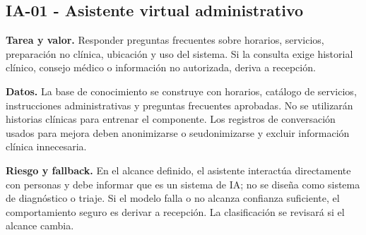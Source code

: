 \documentclass[11pt,a4paper]{article}
\begin{document}
\subsection{IA-01 - Asistente virtual administrativo}
\textbf{Tarea y valor.} Responder preguntas frecuentes sobre horarios, servicios, preparación no clínica, ubicación y uso del sistema. Si la consulta exige historial clínico, consejo médico o información no autorizada, deriva a recepción.

\textbf{Datos.} La base de conocimiento se construye con horarios, catálogo de servicios, instrucciones administrativas y preguntas frecuentes aprobadas. No se utilizarán historias clínicas para entrenar el componente. Los registros de conversación usados para mejora deben anonimizarse o seudonimizarse y excluir información clínica innecesaria.

\textbf{Riesgo y fallback.} En el alcance definido, el asistente interactúa directamente con personas y debe informar que es un sistema de IA; no se diseña como sistema de diagnóstico o triaje. Si el modelo falla o no alcanza confianza suficiente, el comportamiento seguro es derivar a recepción. La clasificación se revisará si el alcance cambia.
\end{document}
